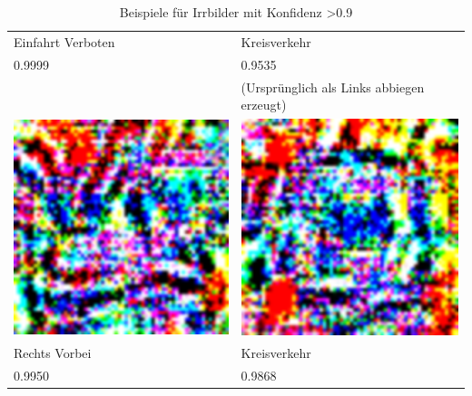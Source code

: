 \begin{table}
\begin{tabular}{p{4.4cm}p{4.4cm}}
	Einfahrt Verboten & Kreisverkehr \\
	0.9999&0.9535\\
	& (Ursprünglich als Links abbiegen erzeugt)\\
	\includegraphics[width=\linewidth]{Images/AnPe/39_RechtsVorbeiOrigLinksvorbei} &\includegraphics[width=\linewidth]{Images/AnPe/40_kreisverkehr}  \\
	Rechts Vorbei& Kreisverkehr\\
	0.9950&0.9868\\
\end{tabular}

\caption{Beispiele für Irrbilder mit Konfidenz >0.9}
\label{tab:gasc1}
\end{table}

